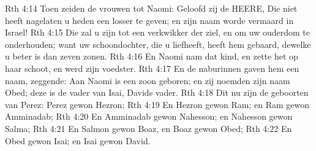 Rth 4:14  Toen zeiden de vrouwen tot Naomi: Geloofd zij de HEERE, Die niet heeft nagelaten u heden een losser te geven; en zijn naam worde vermaard in Israel!
Rth 4:15  Die zal u zijn tot een verkwikker der ziel, en om uw ouderdom te onderhouden; want uw schoondochter, die u liefheeft, heeft hem gebaard, dewelke u beter is dan zeven zonen.
Rth 4:16  En Naomi nam dat kind, en zette het op haar schoot, en werd zijn voedster.
Rth 4:17  En de naburinnen gaven hem een naam, zeggende: Aan Naomi is een zoon geboren; en zij noemden zijn naam Obed; deze is de vader van Isai, Davids vader.
Rth 4:18  Dit nu zijn de geboorten van Perez: Perez gewon Hezron;
Rth 4:19  En Hezron gewon Ram; en Ram gewon Amminadab;
Rth 4:20  En Amminadab gewon Nahesson; en Nahesson gewon Salma;
Rth 4:21  En Salmon gewon Boaz, en Boaz gewon Obed;
Rth 4:22  En Obed gewon Isai; en Isai gewon David.



